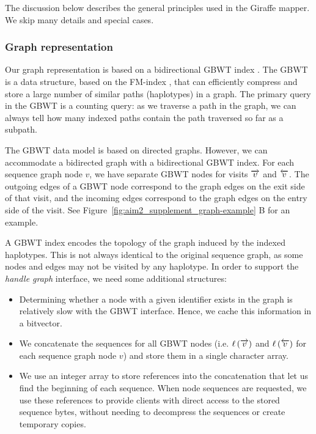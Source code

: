 \documentclass[11pt]{ucscthesis}
\newcommand{\nodelabel}[1]{\ensuremath{\ell\left( #1 \right)}}
\newcommand{\forwardnode}[1]{\ensuremath{\protect\overrightarrow{ #1 }}}
\newcommand{\reversenode}[1]{\ensuremath{\protect\overleftarrow{ #1 }}}
\newcommand{\vocab}[1]{\emph{#1}}
\begin{document}
The discussion below describes the general principles used in the Giraffe mapper.
We skip many details and special cases.



\subsubsection{Graph representation}

Our graph representation is based on a bidirectional GBWT index \cite{siren_indexes_2020}.
The GBWT is a data structure, based on the FM-index \cite{Ferragina2005a}, that can efficiently compress and store a large number of similar paths (haplotypes) in a graph.
The primary query in the GBWT is a counting query: as we traverse a path in the graph, we can always tell how many indexed paths contain the path traversed so far as a subpath.

The GBWT data model is based on directed graphs.
However, we can accommodate a bidirected graph with a bidirectional GBWT index.
For each sequence graph node $v$, we have separate GBWT nodes for visits $\forwardnode{v}$ and $\reversenode{v}$.
The outgoing edges of a GBWT node correspond to the graph edges on the exit side of that visit, and the incoming edges correspond to the graph edges on the entry side of the visit.
See Figure~\ref{fig:aim2_supplement_graph-example} B for an example.

A GBWT index encodes the topology of the graph induced by the indexed haplotypes.
This is not always identical to the original sequence graph, as some nodes and edges may not be visited by any haplotype.
In order to support the \vocab{handle graph} interface\cite{eizenga2020efficient}, we need some additional structures:
\begin{itemize}

\item Determining whether a node with a given identifier exists in the graph is relatively slow with the GBWT interface.
Hence, we cache this information in a bitvector.

\item We concatenate the sequences for all GBWT nodes (i.e. $\nodelabel{\forwardnode{v}}$ and $\nodelabel{\reversenode{v}}$ for each sequence graph node $v$) and store them in a single character array.

\item We use an integer array to store references into the concatenation that let us find the beginning of each sequence. When node sequences are requested, we use these references to provide clients with direct access to the stored sequence bytes, without needing to decompress the sequences or create temporary copies.

\end{itemize}
\end{document}
